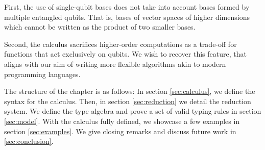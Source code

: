 First, the use of single-qubit bases does not take into account bases formed by multiple entangled qubits. That is, bases of vector spaces of higher dimensions which cannot be written as the product of two smaller bases.

Second, the calculus \cite{Monzon2025} sacrifices higher-order computations as a trade-off for functions that act exclusively on qubits. We wish to recover this feature, that aligns with our aim of writing more flexible algorithms akin to modern programming languages.

The structure of the chapter is as follows: In section \ref{sec:calculus}, we define the syntax for the calculus. Then, in section \ref{sec:reduction} we detail the reduction system. We define the type algebra and prove a set of valid typing rules in section \ref{sec:model}. With the calculus fully defined, we showcase a few examples in section \ref{sec:examples}. We give closing remarks and discuss future work in \ref{sec:conclusion}.
